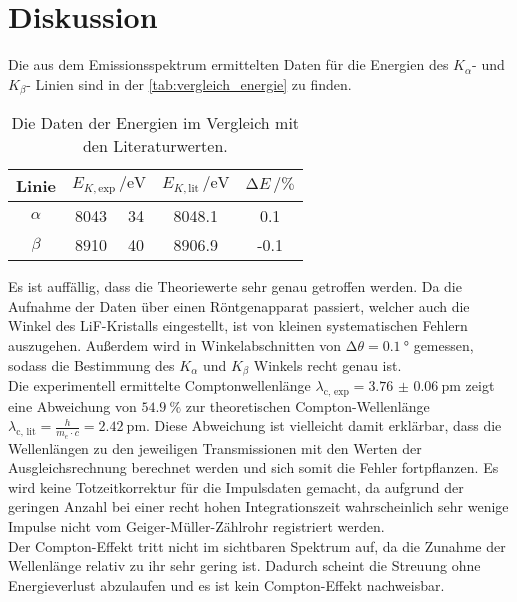 \section{Diskussion}
\label{sec:Diskussion}

Die aus dem Emissionsspektrum ermittelten Daten für die Energien des $K_{\alpha}$- und $K_{\beta}$- Linien sind in der \autoref{tab:vergleich_energie} zu finden. 

\begin{table}[H]
    \centering
    \caption{Die Daten der Energien im Vergleich mit den Literaturwerten.}
    \label{tab:vergleich_energie}
    \begin{tabular}{c c @{${} \pm {}$} c S[table-format=4.1] S[table-format=2.1]}
        \toprule
        Linie &  & {$E_{K, \text{lit}} \, / \si{\electronvolt} $ \cite{theoE}} & {$\increment E  \, / \si{\percent}$} \\
        \midrule
        $\alpha$ &  8043 & 34 & 8048.1 & 0.1 \\
        $\beta $  &  8910 & 40 & 8906.9 & -0.1 \\
        \bottomrule
    \end{tabular}
\end{table}

\noindent Es ist auffällig, dass die Theoriewerte sehr genau getroffen werden. Da die Aufnahme der Daten über einen Röntgenapparat passiert, welcher auch die 
Winkel des LiF-Kristalls eingestellt, ist von kleinen systematischen Fehlern auszugehen. Außerdem wird in Winkelabschnitten von $\increment \theta = \SI{0.1}{\degree}$ 
gemessen, sodass die Bestimmung des $K_{\alpha}$ und $K_{\beta}$ Winkels recht genau ist. \\


\noindent Die experimentell ermittelte Comptonwellenlänge $\lambda_{\text{c, exp}} = \SI{3.76(6)}{\pico\metre}$ zeigt eine Abweichung von $ \SI{54.9}{\percent}$
zur theoretischen Compton-Wellenlänge $\lambda_{\text{c, lit}} = \frac{h}{m_e \cdot c} = \SI{2.42}{\pico\metre}$. Diese Abweichung ist vielleicht damit erklärbar, 
dass die Wellenlängen zu den jeweiligen Transmissionen mit den Werten der Ausgleichsrechnung berechnet werden und sich somit die Fehler fortpflanzen. 
Es wird keine Totzeitkorrektur für die Impulsdaten gemacht, da aufgrund der geringen Anzahl bei einer recht hohen Integrationszeit wahrscheinlich sehr wenige
Impulse nicht vom Geiger-Müller-Zählrohr registriert werden. \\
Der Compton-Effekt tritt nicht im sichtbaren Spektrum auf, da die Zunahme der Wellenlänge relativ zu ihr sehr gering ist. Dadurch scheint die Streuung ohne
Energieverlust abzulaufen und es ist kein Compton-Effekt nachweisbar. 